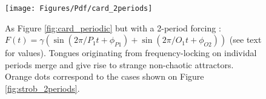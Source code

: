 \begin{figure}
\texttt{[image: Figures/Pdf/card\_2periods]}
\caption
{
As Figure \ref{fig:card_periodic} but with a 2-period forcing : 
$F(t)=\gamma ( \sin( 2\pi / P_1 t + \phi_{P1}) +  \sin( 2\pi / O_1 t + \phi_{O2}) )$ (see text for values). Tongues originating from frequency-locking on individal periods merge and give rise to strange non-chaotic attractors. Orange dots correspond to the cases shown on Figure \ref{fig:strob_2periods}. }
\label{fig:card_2periods}
\end{figure}
